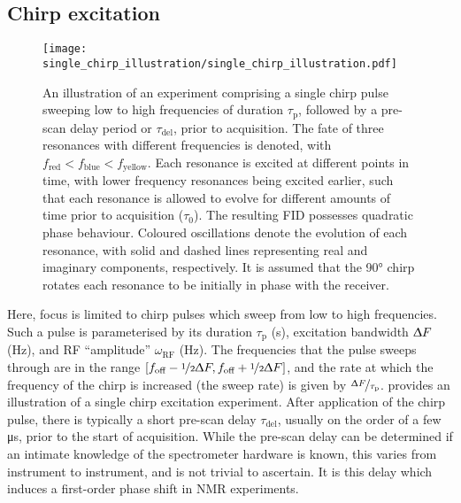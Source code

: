 \subsection{Chirp excitation}
\begin{figure}
    \centering
    \texttt{[image: single\_chirp\_illustration/single\_chirp\_illustration.pdf]}
    \caption[
        An illustration of an experiment comprising a single chirp pulse.
    ]
    {
        An illustration of an experiment comprising a single chirp pulse sweeping
        low to high frequencies of duration $\tau_{\text{p}}$, followed by
        a pre-scan delay period or $\tau_{\text{del}}$, prior to
        acquisition. The fate of three resonances with different frequencies is
        denoted, with $f_{\text{red}} < f_{\text{blue}} <
        f_{\text{yellow}}$. Each resonance is excited at different points
        in time, with lower frequency resonances being excited earlier, such that
        each resonance is allowed to evolve for different amounts of time prior
        to acquisition ($\tau_0$).
        The resulting \ac{FID} possesses quadratic phase behaviour.
        Coloured oscillations denote the evolution of each resonance, with
        solid and dashed lines representing real and imaginary components,
        respectively. It is assumed that the \ang{90} chirp rotates each
        resonance to be initially in phase with the receiver.
    }
    \label{fig:single-chirp}
\end{figure}
Here, focus is limited to chirp pulses which sweep from low to high
frequencies. Such a pulse is parameterised by
its duration $\tau_{\text{p}}$ (\unit{\second}),
excitation bandwidth $\Updelta F$ (\unit{\hertz}),
and \ac{RF} ``amplitude'' $\omega_{\text{RF}}$ (\unit{\hertz}).
The frequencies that the pulse sweeps through are in the range
$[f_{\text{off}} - \nicefrac{1}{2} \Updelta F,
f_{\text{off}} + \nicefrac{1}{2} \Updelta F]$,
and the rate at which the frequency of the chirp is increased (the sweep
rate) is given by $\nicefrac{\Updelta F}{\tau_{\text{p}}}$.
 provides an illustration of a single chirp
excitation experiment. After application of the chirp pulse, there is typically
a short pre-scan delay $\tau_{\text{del}}$, usually on the order of a few
\unit{\micro\second}, prior to the start of acquisition. While the pre-scan
delay can be determined if an intimate knowledge of the spectrometer hardware
is known, this varies from instrument to instrument, and is not trivial to
ascertain. It is this delay which induces a first-order phase shift in \ac{NMR}
experiments.
